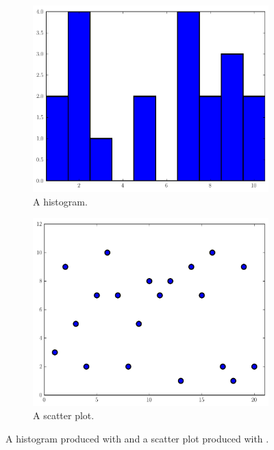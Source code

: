 \begin{figure}
\centering
\begin{subfigure}[t]{.49\textwidth}
\centering
\includegraphics[width=\textwidth]{histogram.pdf}
\caption{A histogram.}
\label{fig:histogram}
\end{subfigure}
\begin{subfigure}[t]{.49\textwidth}
\centering
\includegraphics[width=\textwidth]{scatter.pdf}
\caption{A scatter plot.}
\label{fig:scatter}
\end{subfigure}
\caption{A histogram produced with  and a scatter plot produced with .}
\label{fig:otherplots}
\end{figure}


